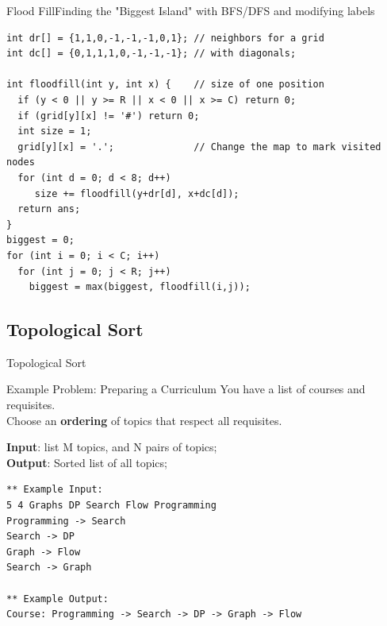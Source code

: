 \begin{frame}[fragile]{Flood Fill}{Finding the "Biggest Island" with BFS/DFS and modifying labels}

  {\smaller
  \begin{exampleblock}{}
\begin{verbatim}
int dr[] = {1,1,0,-1,-1,-1,0,1}; // neighbors for a grid
int dc[] = {0,1,1,1,0,-1,-1,-1}; // with diagonals;

int floodfill(int y, int x) {    // size of one position
  if (y < 0 || y >= R || x < 0 || x >= C) return 0;
  if (grid[y][x] != '#') return 0;
  int size = 1;
  grid[y][x] = '.';              // Change the map to mark visited nodes
  for (int d = 0; d < 8; d++)
     size += floodfill(y+dr[d], x+dc[d]);
  return ans;
}
biggest = 0;
for (int i = 0; i < C; i++)
  for (int j = 0; j < R; j++)
    biggest = max(biggest, floodfill(i,j));
\end{verbatim}
  \end{exampleblock}
  }
\end{frame}

\subsection{Topological Sort}

\begin{frame}[fragile]{Topological Sort}
  \begin{block}{Example Problem: Preparing a Curriculum}
    You have a list of courses and requisites.\\
    Choose an {\bf ordering} of topics that respect all requisites.
    \bigskip

    {\bf Input}: list M topics, and N pairs of topics;\\
    {\bf Output}: Sorted list of all topics;
  \end{block}

{\smaller
\begin{verbatim}
** Example Input:
5 4 Graphs DP Search Flow Programming
Programming -> Search
Search -> DP
Graph -> Flow
Search -> Graph

** Example Output:
Course: Programming -> Search -> DP -> Graph -> Flow
\end{verbatim}

  }
\end{frame}

